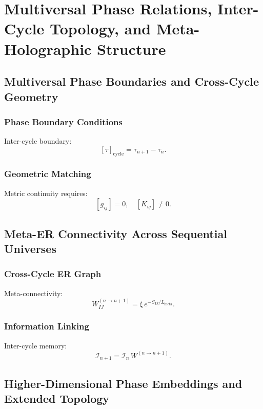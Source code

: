 

\part{Multiversal Phase Relations, Inter-Cycle Topology, and Meta-Holographic Structure}

\chapter{Multiversal Phase Boundaries and Cross-Cycle Geometry}

\section{Phase Boundary Conditions}
Inter-cycle boundary:
\[
[\tau]_{\mathrm{cycle}} = \tau_{n+1} - \tau_n.
\]

\section{Geometric Matching}
Metric continuity requires:
\[
[g_{ij}] = 0,\quad [K_{ij}] \neq 0.
\]

\chapter{Meta-ER Connectivity Across Sequential Universes}

\section{Cross-Cycle ER Graph}
Meta-connectivity:
\[
W^{(n\rightarrow n+1)}_{IJ} = \xi\, e^{-S_{IJ}/L_{\mathrm{meta}}}.
\]

\section{Information Linking}
Inter-cycle memory:
\[
\mathcal{I}_{n+1} = \mathcal{I}_{n}\,W^{(n\rightarrow n+1)}.
\]

\chapter{Higher-Dimensional Phase Embeddings and Extended Topology}

